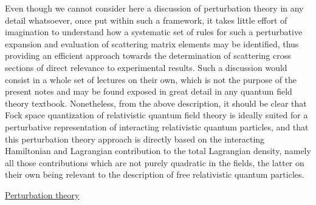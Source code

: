 \documentclass[a4paper,11pt]{article}
\begin{document}
Even though we cannot consider here a discussion of perturbation
theory in any detail whatsoever, once put within such a framework,
it takes little effort of imagination to understand how a systematic
set of rules for such a perturbative expansion and evaluation of
scattering matrix elements may be identified, thus providing an
efficient approach towards the determination
of scattering cross sections of direct relevance to experimental
results. Such a discussion would consist in a whole set of lectures
on their own, which is not the purpose of the present notes and may be found
exposed in great detail in any quantum field theory 
textbook.\cite{Wein2,PS,IZ,Ramond}
Nonetheless, from the above description, it should be clear that
Fock space quantization of relativistic quantum field theory is ideally
suited for a perturbative representation of interacting relativistic quantum
particles, and that this perturbation theory approach is directly based
on the interacting Hamiltonian and Lagrangian contribution to the total
Lagrangian density, namely all those contributions which are not
purely quadratic in the fields, the latter on their own being relevant to the
description of free relativistic quantum particles.

\vspace{10pt}

\noindent\underline{Perturbation theory}

\vspace{10pt}
\end{document}
